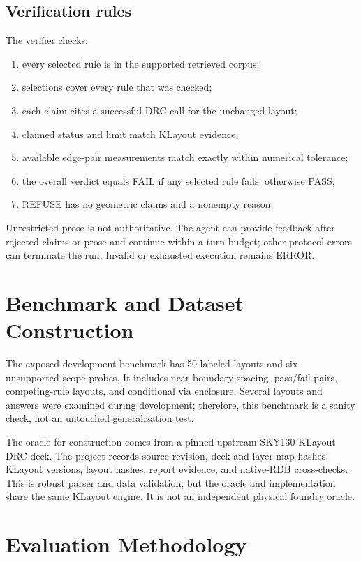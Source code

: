 \documentclass[10pt,twocolumn]{article}
\begin{document}
\subsection{Verification rules}
The verifier checks:
\begin{enumerate}[leftmargin=*,itemsep=1pt]
\item every selected rule is in the supported retrieved corpus;
\item selections cover every rule that was checked;
\item each claim cites a successful DRC call for the unchanged layout;
\item claimed status and limit match KLayout evidence;
\item available edge-pair measurements match exactly within numerical tolerance;
\item the overall verdict equals FAIL if any selected rule fails, otherwise PASS;
\item REFUSE has no geometric claims and a nonempty reason.
\end{enumerate}

Unrestricted prose is not authoritative. The agent can provide feedback after
rejected claims or prose and continue within a turn budget; other protocol errors
can terminate the run. Invalid or exhausted execution remains ERROR.

\section{Benchmark and Dataset Construction}
The exposed development benchmark has 50 labeled layouts and six unsupported-scope
probes. It includes near-boundary spacing, pass/fail pairs, competing-rule layouts,
and conditional via enclosure. Several layouts and answers were examined during
development; therefore, this benchmark is a sanity check, not an untouched
generalization test.

The oracle for construction comes from a pinned upstream SKY130 KLayout DRC deck.
The project records source revision, deck and layer-map hashes, KLayout versions,
layout hashes, report evidence, and native-RDB cross-checks. This is robust parser
and data validation, but the oracle and implementation share the same KLayout engine.
It is not an independent physical foundry oracle.

\clearpage
\section{Evaluation Methodology}
\end{document}
